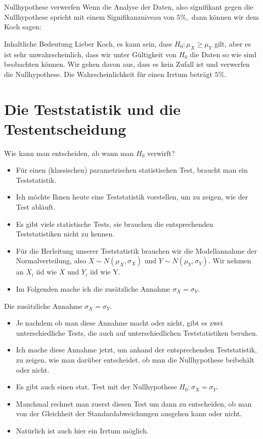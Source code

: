 \documentclass[usenames,dvipsnames,handout]{beamer}
\begin{document}
\begin{frame}{Nullhypothese verwerfen}
Wenn die Analyse der Daten, also signifikant gegen die Nullhypothese spricht mit einem Signifikanzniveau von 
$5\%,$ dann können wir dem Koch sagen:
\begin{block}{Inhaltliche Bedeutung}
Lieber Koch, es kann sein, dass $H_{0}: \mu_{X} \geq \mu_{Y}$ gilt, aber es ist sehr unwahrscheinlich, dass wir 
unter Gültigkeit von $H_{0}$ die Daten so wie sind beobachten können. Wir gehen davon aus, dass es kein Zufall ist und verwerfen
die Nullhypothese. Die Wahrscheinlichkeit für einen Irrtum beträgt $5\%.$
\end{block}
\end{frame}
\section{Die Teststatistik und die Testentscheidung}

\begin{frame}{Wie kann man entscheiden, ab wann man $H_{0}$ verwirft?}
\begin{itemize}
\item{Für einen (klassischen) parametrischen statistischen Test, braucht man ein Teststatistik.}\pause
\item{Ich möchte Ihnen heute eine Teststatistik vorstellen, um zu zeigen, wie der Test abläuft.}\pause
\item{Es gibt viele statistische Tests, sie brauchen die entsprechenden Teststatistiken nicht zu kennen. }\pause
\item{Für die Herleitung unserer Teststatistik brauchen wir die Modellannahme der Normalverteilung,
also $X \sim N(\mu_{X},\sigma_{X})$ und $Y \sim N(\mu_{Y},\sigma_{Y}).$ 
Wir nehmen an $X_{i}$ iid wie $X$ und $Y_{i}$ iid wie Y.}\pause
\item{Im Folgenden mache ich die zusätzliche Annahme $\sigma_{X}=\sigma_{Y}.$}
\end{itemize}
\end{frame}

\begin{frame}{Die zusätzliche Annahme $\sigma_{X}=\sigma_{Y}.$}
\begin{itemize}
\item{Je nachdem ob man diese Annahme macht oder nicht, gibt es zwei unterschiedliche Tests,
die auch auf unterschiedlichen Teststatistiken beruhen.}\pause
\item{Ich mache diese Annahme jetzt, um anhand der entsprechenden Teststatistik, zu zeigen,
wie man darüber entscheidet, ob man die Nullhypothese beibehält oder nicht.}\pause
\item{Es gibt auch einen stat. Test mit der Nullhypothese  $H_{0}: \sigma_{X}=\sigma_{Y}.$ }\pause
\item{Manchmal rechnet man zuerst diesen Test um dann zu entscheiden, ob man von der Gleichheit
der Standardabweichungen ausgehen kann oder nicht. }
\item{Natürlich ist auch hier ein Irrtum möglich.}
\end{itemize}
\end{frame}
\end{document}
